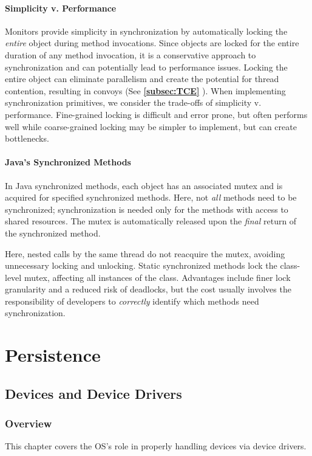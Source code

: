 \documentclass{report}
\newcommand{\refto}[2]{\textbf{\ref{#1:#2} \nameref{#1:#2}}}
\begin{document}
\subsection{Simplicity v. Performance}
Monitors provide simplicity in synchronization by automatically locking the \textit{entire} object
during method invocations. Since objects are locked for the entire duration of any method
invocation, it is a conservative approach to synchronization and can potentially lead to performance
issues. Locking the entire object can eliminate parallelism and create the potential for thread
contention, resulting in convoys (See \refto{subsec}{TCE}). When implementing synchronization
primitives, we consider the trade-offs of simplicity v. performance. Fine-grained locking is
difficult and error prone, but often performs well while coarse-grained locking may be simpler to
implement, but can create bottlenecks.


\subsection{Java's Synchronized Methods}
In Java synchronized methods, each object has an associated mutex and is acquired for specified
synchronized methods. Here, not \textit{all} methods need to be synchronized; synchronization is
needed only for the methods with access to shared resources. The mutex is automatically released
upon the \textit{final} return of the synchronized method.

Here, nested calls by the same thread do not reacquire the mutex, avoiding unnecessary locking and
unlocking. Static synchronized methods lock the class-level mutex, affecting all instances of the
class. Advantages include finer lock granularity and a reduced risk of deadlocks, but the cost
usually involves the responsibility of developers to \textit{correctly} identify which methods need
synchronization.










\part{Persistence}
\chapter{Devices and Device Drivers}
\section{Overview}
This chapter covers the OS's role in properly handling devices via device drivers.
\end{document}
